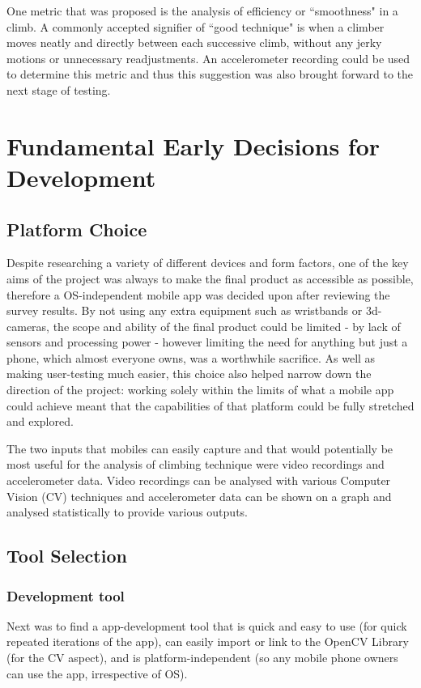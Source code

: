 One metric that was proposed is the analysis of efficiency or ``smoothness" in a climb.
A commonly accepted signifier of ``good technique" is when a climber moves neatly and directly between each successive climb, without any jerky motions or unnecessary readjustments.
An accelerometer recording could be used to determine this metric and thus this suggestion was also brought forward to the next stage of testing.



\section{Fundamental Early Decisions for Development}

\subsection{Platform Choice}
Despite researching a variety of different devices and form factors, one of the key aims of the project was always to make the final product as accessible as possible, therefore a OS-independent mobile app was decided upon after reviewing the survey results.
By not using any extra equipment such as wristbands or 3d-cameras, the scope and ability of the final product could be limited - by lack of sensors and processing power - however limiting the need for anything but just a phone, which almost everyone owns, was a worthwhile sacrifice.
As well as making user-testing much easier, this choice also helped narrow down the direction of the project: working solely within the limits of what a mobile app could achieve meant that the capabilities of that platform could be fully stretched and explored.

The two inputs that mobiles can easily capture and that would potentially be most useful for the analysis of climbing technique were video recordings and accelerometer data.
Video recordings can be analysed with various Computer Vision (CV) techniques and accelerometer data can be shown on a graph and analysed statistically to provide various outputs.


\subsection{Tool Selection}
\subsubsection{Development tool}
Next was to find a app-development tool that is quick and easy to use (for quick repeated iterations of the app), can easily import or link to the OpenCV Library (for the CV aspect), and is platform-independent (so any mobile phone owners can use the app, irrespective of OS).

